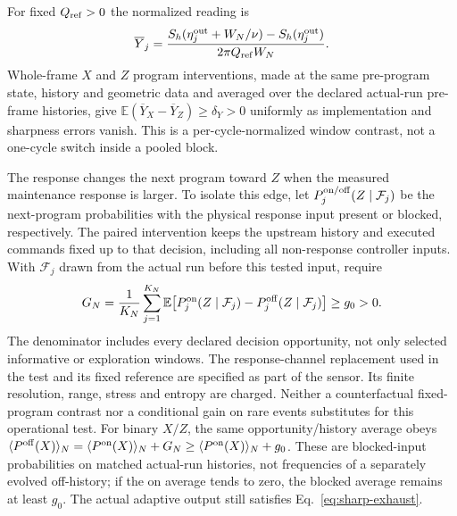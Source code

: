 \begin{conjecture}
For fixed $Q_{\rm ref}>0$ the normalized reading is
\begin{equation}\label{eq:window-horizon-reading}
 \overline Y_j=
 \frac{S_h(\eta_j^{\rm out}+W_N/\nu)-S_h(\eta_j^{\rm out})}
      {2\pi Q_{\rm ref}W_N}.
\end{equation}
Whole-frame $X$ and $Z$ program interventions, made at the same
pre-program state, history and geometric data and averaged over the
declared actual-run pre-frame histories, give
$\mathbb E(\overline Y_X-\overline Y_Z)\ge\delta_Y>0$
uniformly as implementation and sharpness errors vanish.
This is a per-cycle-normalized window contrast, not a one-cycle switch
inside a pooled block.

The response changes the next program toward $Z$ when the measured
maintenance response is larger. To isolate this edge, let
$P_j^{\rm on/off}(Z\mid\mathcal F_j)$ be the next-program probabilities with
the physical response input present or blocked, respectively.
The paired intervention keeps the upstream history and executed commands
fixed up to that decision, including all non-response controller inputs.
With $\mathcal F_j$ drawn from the actual run before this tested input, require
\begin{equation}\label{eq:window-response-gain}
 G_N=\frac1{K_N}\sum_{j=1}^{K_N}
       \mathbb E\!\left[P_j^{\rm on}(Z\mid\mathcal F_j)
                       -P_j^{\rm off}(Z\mid\mathcal F_j)\right]\ge g_0>0.
\end{equation}
The denominator includes every declared decision opportunity, not only
selected informative or exploration windows. The response-channel
replacement used in the test and its fixed reference are specified as
part of the sensor. Its finite resolution, range, stress and entropy
are charged. Neither a counterfactual fixed-program contrast nor a
conditional gain on rare events substitutes for this operational test.
For binary $X/Z$, the same opportunity/history average obeys
$\langle P^{\rm off}(X)\rangle_N
=\langle P^{\rm on}(X)\rangle_N+G_N
\ge\langle P^{\rm on}(X)\rangle_N+g_0$.
These are blocked-input probabilities on matched actual-run histories,
not frequencies of a separately evolved off-history; if the on average
tends to zero, the blocked average remains at least $g_0$.
The actual adaptive output still satisfies Eq.~\eqref{eq:sharp-exhaust}.


\end{conjecture}
